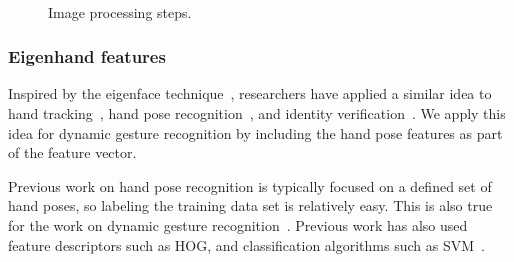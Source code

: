 \documentclass[10pt,twocolumn,letterpaper]{article}
\begin{document}
\begin{figure}[tb]
  \centering
   ~
  \caption{Image processing steps.}
  \label{fig:key-boundary}
\end{figure}

\subsubsection{Eigenhand features}  
Inspired by the eigenface technique~\cite{turk91}, researchers have applied a similar idea to hand tracking~\cite{asaari12},
hand pose recognition~\cite{Malassiotis08}, and identity verification~\cite{tantachun06}. We apply
this idea for dynamic gesture recognition by including the hand pose features as
part of the feature vector.

Previous work on hand pose recognition is typically focused on a defined set of hand poses, so
labeling the training data set is relatively easy. This is also true for the work on dynamic gesture recognition~\cite{song12}.
Previous work has also used feature descriptors such as HOG, and classification algorithms such as SVM~\cite{song12}.
\end{document}
